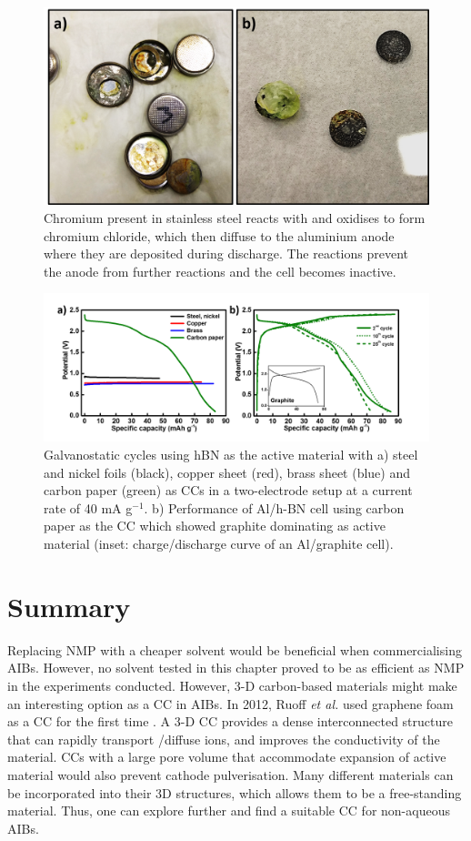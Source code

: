 \begin{figure}[tbh!]
\centering
\includegraphics[width=\textwidth]{Figures/chap7fig/steeleffect}
\caption{Chromium present in stainless steel reacts with  and oxidises to form chromium chloride, which then diffuse to the aluminium anode where they are deposited during discharge. The reactions prevent the anode from further reactions and the cell becomes inactive.}
\label{Figures/chap7fig:steeleffect}
\end{figure}
\begin{figure}[tbh!]
\centering
\includegraphics[width=\textwidth]{Figures/chap7fig/hBNCCCDC}
\caption{Galvanostatic cycles using hBN as the active material with a) steel and nickel foils (black), copper sheet (red), brass sheet (blue) and carbon paper (green) as CCs in a two-electrode setup at a current rate of 40 mA g$^{-1}$. b) Performance of Al/h-BN cell using carbon paper as the CC which showed graphite dominating as active material (inset: charge/discharge curve of an Al/graphite cell).}
\label{Figures/chap7fig:hBNCCCDC}
\end{figure}

\section{Summary}
Replacing NMP with a cheaper solvent would be beneficial when commercialising AIBs. However, no solvent tested in this chapter proved to be as efficient as NMP in the experiments conducted. However, 3-D carbon-based materials might make an interesting option as a CC in AIBs. In 2012, Ruoff \textit{et al.} used graphene foam as a CC for the first time \cite{ji_ultrathin_2012}. A 3-D CC provides a dense interconnected structure that can rapidly transport /diffuse ions, and improves the conductivity of the material. CCs with a large pore volume that accommodate expansion of active material would also prevent cathode pulverisation. Many different materials can be incorporated into their 3D structures, which allows them to be a free-standing material. Thus, one can explore further and find a suitable CC for non-aqueous AIBs.
